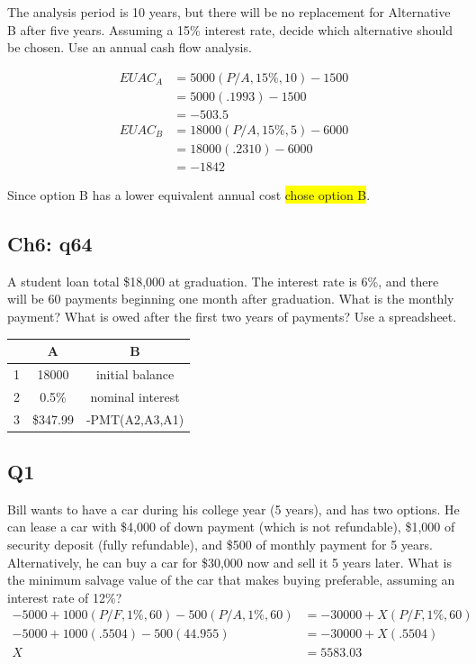\documentclass[12pt]{article}
\newcommand{\hilight}[1]{\colorbox{yellow}{#1}}
\begin{document}
The analysis period is 10 years, but there will be no replacement for Alternative B after five years. Assuming a 15\% interest rate, decide which alternative should be chosen. Use an annual cash flow analysis.

\begin{align*}
EUAC_A &= 5000(P/A, 15\%, 10) - 1500\\
    &= 5000(.1993) - 1500\\
    &= -503.5\\
EUAC_B &= 18000(P/A, 15\%, 5) - 6000\\
    &= 18000(.2310) - 6000\\
    &= -1842
\end{align*}

Since option B has a lower equivalent annual cost \hilight{chose option B}.

\subsection*{Ch6: q64}
A student loan total \$18,000 at graduation. The interest rate is 6\%, and there will be 60 payments beginning one month after graduation. What is the monthly payment? What is owed after the first two years of payments? Use a spreadsheet.
\begin{center}

\begin{tabular}{| c | c | c |}
\hline
& A & B\\
\hline
1 & 18000 & initial balance\\
\hline
2 & 0.5\% & nominal interest\\
\hline
3 & \$347.99 & -PMT(A2,A3,A1)\\
\hline
\end{tabular}
\end{center}

\subsection*{Q1}
Bill wants to have a car during his college year (5 years), and has two options. He can
lease a car with \$4,000 of down payment (which is not refundable), \$1,000 of security deposit (fully refundable), and \$500 of monthly payment for 5 years. Alternatively, he can buy a car for \$30,000 now and sell it 5 years later. What is the minimum salvage value of the car that makes buying preferable, assuming an interest rate of 12\%?
\begin{align*}
-5000 + 1000(P/F, 1\%, 60) - 500(P/A, 1\%, 60) &= -30000 + X(P/F, 1\%, 60)\\
-5000 + 1000(.5504) - 500(44.955) &= -30000 + X(.5504)\\
X &=5583.03
\end{align*}
\end{document}
